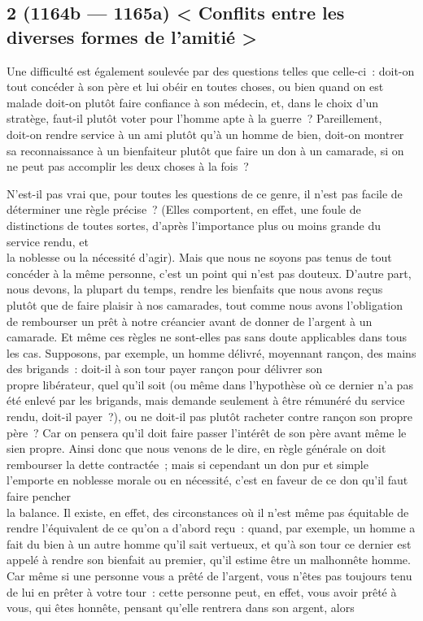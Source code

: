 \documentclass[french,twoside]{book} %
\begin{document}
\subsection[{2 (1164b — 1165a) < Conflits entre les diverses formes de l’amitié >}]{2 (1164b — 1165a) < Conflits entre les diverses formes de l’amitié >}
\noindent Une difficulté est également soulevée par des questions telles que celle-ci : doit-on tout concéder à son père et lui obéir en toutes choses, ou bien quand on est malade doit-on plutôt faire confiance à son médecin, et, dans le choix d’un stratège, faut-il plutôt voter pour l’homme apte à la guerre ? Pareillement, \\
doit-on rendre service à un ami plutôt qu’à un homme de bien, doit-on montrer sa reconnaissance à un bienfaiteur plutôt que faire un don à un camarade, si on ne peut pas accomplir les deux choses à la fois ?\par
N’est-il pas vrai que, pour toutes les questions de ce genre, il n’est pas facile de déterminer une règle précise ? (Elles comportent, en effet, une foule de distinctions de toutes sortes, d’après l’importance plus ou moins grande du service rendu, et \\
la noblesse ou la nécessité d’agir). Mais que nous ne soyons pas tenus de tout concéder à la même personne, c’est un point qui n’est pas douteux. D’autre part, nous devons, la plupart du temps, rendre les bienfaits que nous avons reçus plutôt que de faire plaisir à nos camarades, tout comme nous avons l’obligation de rembourser un prêt à notre créancier avant de donner de l’argent à un camarade. Et même ces règles ne sont-elles pas sans doute applicables dans tous les cas. Supposons, par exemple, un homme délivré, moyennant rançon, des mains des brigands : doit-il à son tour payer rançon pour délivrer son \\
propre libérateur, quel qu’il soit (ou même dans l’hypothèse où ce dernier n’a pas été enlevé par les brigands, mais demande  seulement à être rémunéré du service rendu, doit-il payer ?), ou ne doit-il pas plutôt racheter contre rançon son propre père ? Car on pensera qu’il doit faire passer l’intérêt de son père avant même le sien propre. Ainsi donc que nous venons de le dire, en règle générale on doit rembourser la dette contractée ; mais si cependant un don pur et simple l’emporte en noblesse morale ou en nécessité, c’est en faveur de ce don qu’il faut faire pencher \\
la balance. Il existe, en effet, des circonstances où il n’est même pas équitable de rendre l’équivalent de ce qu’on a d’abord reçu : quand, par exemple, un homme a fait du bien à un autre homme qu’il sait vertueux, et qu’à son tour ce dernier est appelé à rendre son bienfait au premier, qu’il estime être un malhonnête homme. Car même si une personne vous a prêté de l’argent, vous n’êtes pas toujours tenu de lui en prêter à votre tour : cette personne peut, en effet, vous avoir prêté à vous, qui êtes honnête, pensant qu’elle rentrera dans son argent, alors \\
\end{document}
